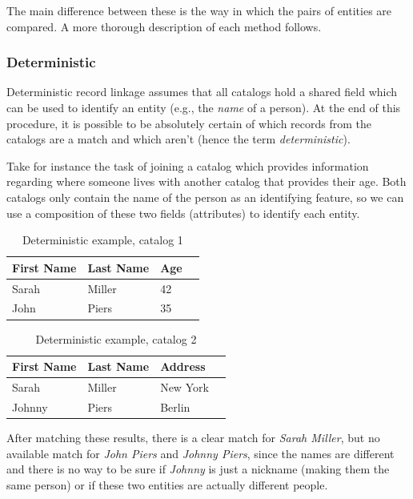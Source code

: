\documentclass[epsfig,a4paper,11pt,titlepage,twoside,openany]{book}
\begin{document}
The main difference between these is the way in which the pairs of entities are compared. A more thorough description of each method follows.


\subsubsection{Deterministic}
\label{sec:rl-approach-deterministic}

Deterministic record linkage assumes that
all catalogs hold a shared field which can be used to identify an entity (e.g., the
\textit{name} of a person). At the end of this procedure, it is possible to be absolutely certain of
which records from the catalogs are a match and which aren't (hence the term
\textit{deterministic}).

Take for instance the task of joining a catalog which provides information regarding where someone
lives with another catalog that provides their age. Both catalogs only contain the
name of the person as an identifying feature, so we can use a composition of
these two fields (attributes) to identify each entity.

\begin{table}[H]
  \centering{}
  \begin{tabular}{|l|l|l|l|}
    First Name & Last Name & Age \\ \hline
    Sarah & Miller & 42 \\
    John  & Piers  & 35  \\ 
  \end{tabular}
  \caption{Deterministic example, catalog 1}
  \label{tab:ex-deterministic-1}
\end{table}


\begin{table}[H]
  \centering{}
  \begin{tabular}{|l|l|l|l|}
    First Name & Last Name & Address \\ \hline
    Sarah  & Miller & New York \\
    Johnny & Piers  & Berlin  \\ 
  \end{tabular}
  \caption{Deterministic example, catalog 2}
  \label{tab:ex-deterministic-2}
\end{table}

After matching these results, there is a clear match for \textit{Sarah Miller}, but no available match for \textit{John Piers} and \textit{Johnny Piers}, since the
names are different and there is no way to be sure if \textit{Johnny} is just a nickname (making them the same person)
or if these two entities are actually different people.
\end{document}
